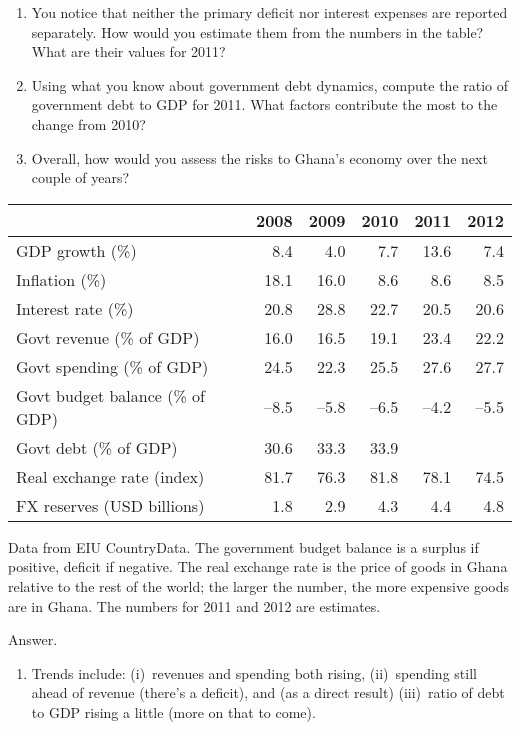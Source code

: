 \begin{enumerate}
\begin{enumerate}
\item You notice that neither the primary deficit nor
interest expenses are reported separately.
How would you estimate them from the numbers in the table?
What are their values for 2011?

\item Using what you know about government debt dynamics,
compute the ratio of government debt to GDP for 2011.
What factors contribute the most to the change from 2010?

\item Overall, how would you assess the risks to Ghana's economy over
the next couple of years?
\end{enumerate}

{\small
\begin{tabular}{lrrrrr}
\toprule
        & 2008 & 2009 & 2010 & 2011 & 2012 \\
\midrule
GDP growth (\%) & 8.4 & 4.0 & 7.7 & 13.6 & 7.4 \\
Inflation (\%)  & 18.1 & 16.0 & 8.6 & 8.6 & 8.5 \\
Interest rate (\%) & 20.8 & 28.8 & 22.7 & 20.5 & 20.6  \\
Govt revenue (\% of GDP)  & 16.0 & 16.5 & 19.1 & 23.4 & 22.2 \\
Govt spending (\% of GDP) & 24.5 & 22.3 & 25.5 & 27.6 & 27.7 \\
Govt budget balance (\% of GDP) & --8.5 & --5.8 & --6.5& --4.2 & --5.5\\
Govt debt (\% of GDP) & 30.6 & 33.3 & 33.9 & {\bf } & {\bf } \\ %
Real exchange rate (index) & 81.7 & 76.3 & 81.8 & 78.1 & 74.5\\
FX reserves (USD billions) & 1.8 & 2.9 & 4.3 & 4.4 & 4.8 \\
\bottomrule
\end{tabular}
}

\medskip
Data from EIU CountryData.
The government budget balance is a surplus if positive, deficit if negative.
The real exchange rate is the price of goods in Ghana relative to the rest
of the world;
the larger the number, the more expensive goods are in Ghana.
The numbers for 2011 and 2012 are estimates.

Answer.
\begin{enumerate}
\item Trends include:
(i)~revenues and spending both rising,
(ii)~spending still ahead of revenue (there's a deficit),
and (as a direct result)
(iii)~ratio of debt to GDP rising a little
(more on that to come).


\end{enumerate}
\end{enumerate}
